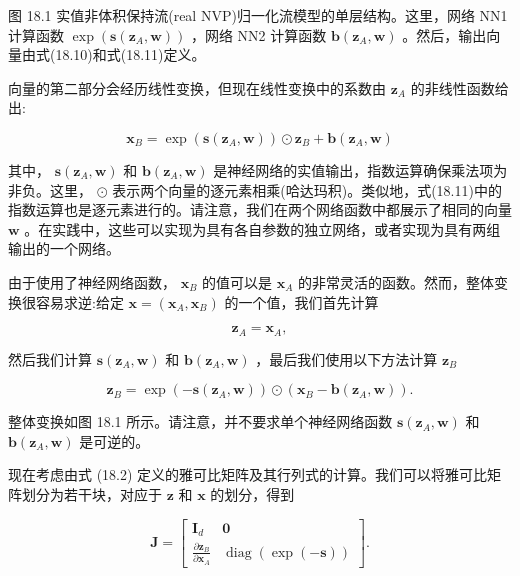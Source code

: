 \documentclass[10pt]{report}
\begin{document}
图 18.1 实值非体积保持流(real NVP)归一化流模型的单层结构。这里，网络 NN1 计算函数 \(\exp \left( {\mathbf{s}\left( {{\mathbf{z}}_{A},\mathbf{w}}\right) }\right)\) ，网络 NN2 计算函数 \(\mathbf{b}\left( {{\mathbf{z}}_{A},\mathbf{w}}\right)\) 。然后，输出向量由式(18.10)和式(18.11)定义。

向量的第二部分会经历线性变换，但现在线性变换中的系数由 \({\mathbf{z}}_{A}\) 的非线性函数给出:

\[
{\mathbf{x}}_{B} = \exp \left( {\mathbf{s}\left( {{\mathbf{z}}_{A},\mathbf{w}}\right) }\right)  \odot  {\mathbf{z}}_{B} + \mathbf{b}\left( {{\mathbf{z}}_{A},\mathbf{w}}\right)  \tag{18.11}
\]

其中， \(\mathbf{s}\left( {{\mathbf{z}}_{A},\mathbf{w}}\right)\) 和 \(\mathbf{b}\left( {{\mathbf{z}}_{A},\mathbf{w}}\right)\) 是神经网络的实值输出，指数运算确保乘法项为非负。这里， \(\odot\) 表示两个向量的逐元素相乘(哈达玛积)。类似地，式(18.11)中的指数运算也是逐元素进行的。请注意，我们在两个网络函数中都展示了相同的向量 \(\mathbf{w}\) 。在实践中，这些可以实现为具有各自参数的独立网络，或者实现为具有两组输出的一个网络。

由于使用了神经网络函数， \({\mathbf{x}}_{B}\) 的值可以是 \({\mathbf{x}}_{A}\) 的非常灵活的函数。然而，整体变换很容易求逆:给定 \(\mathbf{x} = \left( {{\mathbf{x}}_{A},{\mathbf{x}}_{B}}\right)\) 的一个值，我们首先计算

\[
{\mathbf{z}}_{A} = {\mathbf{x}}_{A}, \tag{18.12}
\]

然后我们计算 \(\mathbf{s}\left( {{\mathbf{z}}_{A},\mathbf{w}}\right)\) 和 \(\mathbf{b}\left( {{\mathbf{z}}_{A},\mathbf{w}}\right)\) ，最后我们使用以下方法计算 \({\mathbf{z}}_{B}\)

\[
{\mathbf{z}}_{B} = \exp \left( {-\mathbf{s}\left( {{\mathbf{z}}_{A},\mathbf{w}}\right) }\right)  \odot  \left( {{\mathbf{x}}_{B} - \mathbf{b}\left( {{\mathbf{z}}_{A},\mathbf{w}}\right) }\right) . \tag{18.13}
\]

整体变换如图 18.1 所示。请注意，并不要求单个神经网络函数 \(\mathbf{s}\left( {{\mathbf{z}}_{A},\mathbf{w}}\right)\) 和 \(\mathbf{b}\left( {{\mathbf{z}}_{A},\mathbf{w}}\right)\) 是可逆的。

现在考虑由式 (18.2) 定义的雅可比矩阵及其行列式的计算。我们可以将雅可比矩阵划分为若干块，对应于 \(\mathbf{z}\) 和 \(\mathbf{x}\) 的划分，得到

\[
\mathbf{J} = \left\lbrack  \begin{matrix} {\mathbf{I}}_{d} & \mathbf{0} \\  \frac{\partial {\mathbf{z}}_{B}}{\partial {\mathbf{x}}_{A}} & \operatorname{diag}\left( {\exp \left( {-\mathbf{s}}\right) }\right)  \end{matrix}\right\rbrack  . \tag{18.14}
\]
\end{document}
